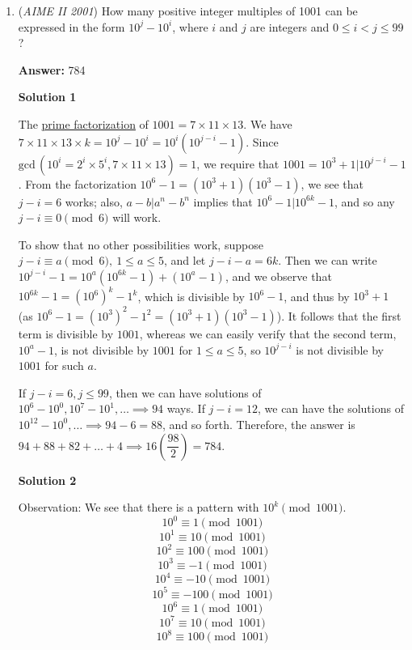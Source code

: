 \begin{enumerate}
 
In total, there are $68+22+4+1=95$ coloring methods with 2-by-2 red squares.
 \[\frac{m}{n}=1-\frac{95}{2^9}=\frac{417}{512}\]

 \[m+n=417+512=\boxed{\textbf{929}}\]



	\item (\textit{AIME II 2001}) How many positive integer multiples of 1001 can be expressed in the form $10^{j} - 10^{i}$, where $i$ and $j$ are integers and $0\leq i < j \leq 99$?


 
 \textbf{Answer: }784



\textbf{Solution 1}

The \href{https://artofproblemsolving.com/wiki/index.php?title=Prime\_factorization}{prime factorization} of $1001 = 7\times 11\times 13$. We have $7\times 11\times 13\times k = 10^j - 10^i = 10^i(10^{j - i} - 1)$. Since $\text{gcd}\,(10^i = 2^i \times 5^i, 7 \times 11 \times 13) = 1$, we require that $1001 = 10^3 + 1 | 10^{j-i} - 1$. From the factorization $10^6 - 1 = (10^3 + 1)(10^{3} - 1)$, we see that $j-i = 6$ works; also, $a-b | a^n - b^n$ implies that $10^{6} - 1 | 10^{6k} - 1$, and so any $\boxed{j-i \equiv 0 \pmod{6}}$ will work. 

 To show that no other possibilities work, suppose $j-i \equiv a \pmod{6},\ 1 \le a \le 5$, and let $j-i-a = 6k$. Then we can write $10^{j-i} - 1 = 10^{a} \left(10^{6k} - 1\right) + \left(10^{a} - 1\right)$, and we observe that $10^{6k}-1 = \left(10^6\right)^k-1^k$, which is divisible by $10^6-1$, and thus by $10^3+1$ (as $10^6-1 = \left(10^3\right)^2-1^2 = \left(10^3+1\right)\left(10^3-1\right)$). It follows that the first term is divisible by $1001$, whereas we can easily verify that the second term, $10^a-1$, is not divisible by $1001$ for $1 \le a \le 5$, so $10^{j-i}$ is not divisible by $1001$ for such $a$.

 If $j - i = 6, j\leq 99$, then we can have solutions of $10^6 - 10^0, 10^7 - 10^1, \dots\implies 94$ ways. If $j - i = 12$, we can have the solutions of $10^{12} - 10^{0},\dots\implies 94 - 6 = 88$, and so forth. Therefore, the answer is $94 + 88 + 82 + \dots + 4\implies 16\left(\dfrac{98}{2}\right) = \boxed{784}$.

 



\textbf{Solution 2}

Observation: We see that there is a pattern with $10^k \pmod{1001}$. 
 \[10^0 \equiv 1 \pmod{1001}\]
 \[10^1 \equiv 10 \pmod{1001}\]
 \[10^2 \equiv 100 \pmod{1001}\]
 \[10^3 \equiv -1 \pmod{1001}\]
 \[10^4 \equiv -10 \pmod{1001}\]
 \[10^5 \equiv -100 \pmod{1001}\]
 \[10^6 \equiv 1 \pmod{1001}\]
 \[10^7 \equiv 10 \pmod{1001}\]
 \[10^8 \equiv 100 \pmod{1001}\]


\end{enumerate}
